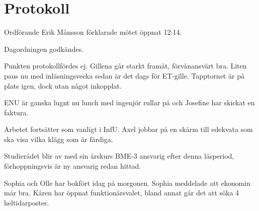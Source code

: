 \documentclass[10pt]{article}
\def\mo{Erik Månsson}
\begin{document}
\section*{Protokoll}
\begin{paragrafer}
Ordförande {\mo} förklarade mötet öppnat 12:14.

{\valavmo}

{\valavms}

{\valavj}

{\tosg}

{\ingaadj}

Dagordningen godkändes.


\begin{fyllnadsval} %
\end{fyllnadsval}

\begin{paragrafer}
Punkten protokollfördes ej.
Gillena går starkt framåt, förvånansvärt bra. Liten paus nu med inläsningsvecka sedan är det dags för ET-gille. Tapptornet är på plats igen, dock utan något inkopplat.

ENU är ganska lugnt nu lunch med ingenjör rullar på och Josefine har skickat en faktura.

Arbetet fortsätter som vanligt i InfU. Axel jobbar på en skärm till edekvata som ska visa vilka klägg som är färdiga.

Studierådet blir av med sin årskurs BME-3 ansvarig efter denna läsperiod, förhoppningsvis är ny ansvarig redan hittad.

Sophia och Olle har bokfört idag på morgonen.
Sophia meddelade att ekonomin mår bra.
Kåren har öppnat funktionärsvalet, bland annat går det att söka 4 heltidarposter.


\end{paragrafer}
\end{paragrafer}
\end{document}

